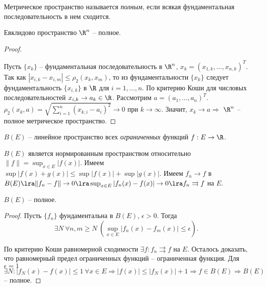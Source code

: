 \begin{definition}
    Метрическое пространство называется \textit{полным}, если всякая фундаментальная последовательность в нем сходится.
\end{definition}

\begin{theorem}
    Евклидово пространство $\R^{n}$ -- полное.
\end{theorem}

\begin{proof}~

    Пусть $\{x_{k}\}$ -- фундаментальная последовательность в $\R^{n}$, $x_{k} = (x_{1, k}, \ldots, x_{n, k})^{T}$. Так как $|x_{i, k} - x_{i, m}| \leq \rho_{2}(x_{k}, x_{m})$, то из фундаментальности $\{x_{k}\}$ следует фундаментальность $\{x_{i, k}\}$ в $\R$ для $i = 1, \ldots , n$. По критерию Коши для числовых последовательностей $x_{i, k} \to a_{k} \in \R$. Рассмотрим $a = (a_{1}, \ldots, a_{n})^{T}$. $\rho_{2}(x_{k}, a) = \sqrt{\sum_{i = 1}^{n}(x_{k, i} - a_{i})^{2}} \to 0$ при $k \to \infty$. Значит, $x_{k} \to a \Rightarrow$ $\R^{n}$ -- полное метрическое пространство.
\end{proof}

\begin{example}
    $B(E)$ -- линейное пространство всех \textit{ограниченных} функций $f: E \to \R$.

    $B(E)$ является нормированным пространством относительно $\|f\| = \sup_{x \in E}|f(x)|$. Имеем $\sup|f(x) + g(x)| \leq \sup|f(x)| + \sup|g(x)|$. Имеем $f_{n} \to f$ в $B(E) \lra \|f_{n} - f\| \to 0 \lra \sup_{x \in E}|f_{n}(x) - f(x)| \to 0 \lra f_{n} \rightrightarrows f$ на $E$.
\end{example}

\begin{theorem}
    $B(E)$ -- полное.
\end{theorem}

\begin{proof}
    Пусть $\{f_{n}\}$ фундаментальна в $B(E)$, $\epsilon > 0$. Тогда 
    \[\exists N \ \forall n, m \geq N \ (\sup_{x \in E} |f_{n}(x) - f_{m}(x)| \leq \epsilon).\]

    По критерию Коши равномерной сходимости $\exists f: f_{n} \rightrightarrows f$ на $E$. Осталось доказать, что равномерный предел ограниченных функций -- ограниченная функция. Для $\epsilon = 1$ $\exists N: |f_{N}(x) - f(x)| \leq 1 \ \forall x \in E \Rightarrow |f(x)| \leq |f_{N}(x)| + 1 \Rightarrow f \in B(E) \Rightarrow B(E)$ -- полное.
\end{proof}

